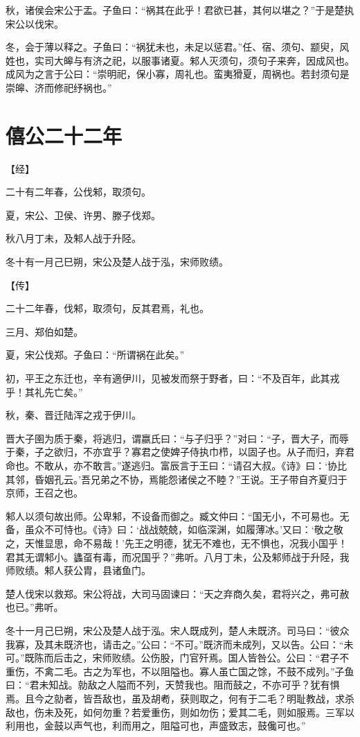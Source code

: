 \documentclass[a4paper,12pt,UTF8,twoside]{ctexbook}
\begin{document}
秋，诸侯会宋公于盂。子鱼曰：“祸其在此乎！君欲已甚，其何以堪之？”于是楚执宋公以伐宋。

冬，会于薄以释之。子鱼曰：“祸犹未也，未足以惩君。”任、宿、须句、颛臾，风姓也，实司大皞与有济之祀，以服事诸夏。邾人灭须句，须句子来奔，因成风也。成风为之言于公曰：“崇明祀，保小寡，周礼也。蛮夷猾夏，周祸也。若封须句是崇皞、济而修祀纾祸也。”

\chapter{僖公二十二年}



【经】

二十有二年春，公伐邾，取须句。

夏，宋公、卫侯、许男、滕子伐郑。

秋八月丁未，及邾人战于升陉。

冬十有一月己巳朔，宋公及楚人战于泓，宋师败绩。

【传】

二十二年春，伐邾，取须句，反其君焉，礼也。

三月、郑伯如楚。



夏，宋公伐郑。子鱼曰：“所谓祸在此矣。”

初，平王之东迁也，辛有適伊川，见被发而祭于野者，曰：“不及百年，此其戎乎！其礼先亡矣。”

秋，秦、晋迁陆浑之戎于伊川。

晋大子圉为质于秦，将逃归，谓嬴氏曰：“与子归乎？”对曰：“子，晋大子，而辱于秦，子之欲归，不亦宜乎？寡君之使婢子侍执巾栉，以固子也。从子而归，弃君命也。不敢从，亦不敢言。”遂逃归。富辰言于王曰：“请召大叔。《诗》曰：‘协比其邻，昏姻孔云。’吾兄弟之不协，焉能怨诸侯之不睦？”王说。王子带自齐夏归于京师，王召之也。

邾人以须句故出师。公卑邾，不设备而御之。臧文仲曰：“国无小，不可易也。无备，虽众不可恃也。《诗》曰：‘战战兢兢，如临深渊，如履薄冰。’又曰：‘敬之敬之，天惟显思，命不易哉！’先王之明德，犹无不难也，无不惧也，况我小国乎！君其无谓邾小。蠭虿有毒，而况国乎？”弗听。八月丁未，公及邾师战于升陉，我师败绩。邾人获公胄，县诸鱼门。

楚人伐宋以救郑。宋公将战，大司马固谏曰：“天之弃商久矣，君将兴之，弗可赦也已。”弗听。



冬十一月己巳朔，宋公及楚人战于泓。宋人既成列，楚人未既济。司马曰：“彼众我寡，及其未既济也，请击之。”公曰：“不可。”既济而未成列，又以告。公曰：“未可。”既陈而后击之，宋师败绩。公伤股，门官歼焉。国人皆咎公。公曰：“君子不重伤，不禽二毛。古之为军也，不以阻隘也。寡人虽亡国之馀，不鼓不成列。”子鱼曰：“君未知战。勍敌之人隘而不列，天赞我也。阻而鼓之，不亦可乎？犹有惧焉。且今之勍者，皆吾敌也，虽及胡耇，获则取之，何有于二毛？明耻教战，求杀敌也，伤未及死，如何勿重？若爱重伤，则如勿伤；爱其二毛，则如服焉。三军以利用也，金鼓以声气也，利而用之，阻隘可也，声盛致志，鼓儳可也。”
\end{document}
